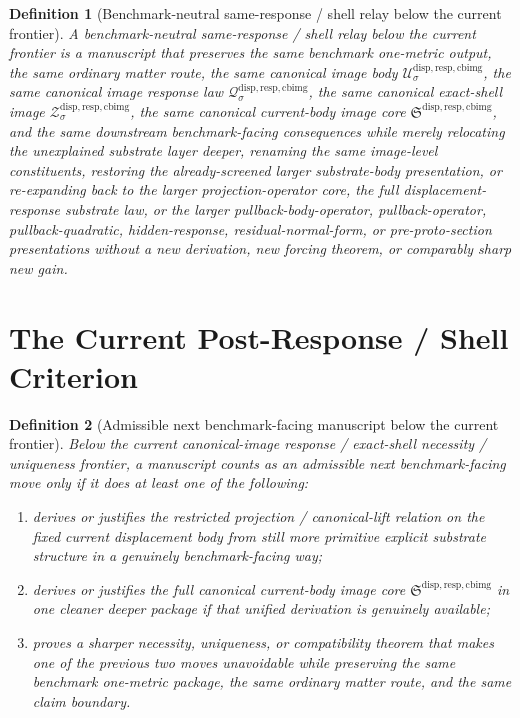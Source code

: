 \documentclass[11pt]{article}
\newcommand{\CurrentBodyImageCore}{\mathfrak S^{\mathrm{disp,resp,cbimg}}}
\newcommand{\CanonicalImageBody}[1]{\mathcal U_{#1}^{\mathrm{disp,resp,cbimg}}}
\newcommand{\CanonicalImageShell}[1]{\mathcal Z_{#1}^{\mathrm{disp,resp,cbimg}}}
\newcommand{\CanonicalImageResponseLaw}[1]{\mathscr Q_{#1}^{\mathrm{disp,resp,cbimg}}}
\newtheorem{definition}{Definition}
\begin{document}
\begin{definition}[Benchmark-neutral same-response / shell relay below the current frontier]
A \emph{benchmark-neutral same-response / shell relay below the current frontier} is a manuscript that preserves the same benchmark one-metric output, the same ordinary matter route, the same canonical image body \(\CanonicalImageBody{\sigma}\), the same canonical image response law \(\CanonicalImageResponseLaw{\sigma}\), the same canonical exact-shell image \(\CanonicalImageShell{\sigma}\), the same canonical current-body image core \(\CurrentBodyImageCore\), and the same downstream benchmark-facing consequences while merely relocating the unexplained substrate layer deeper, renaming the same image-level constituents, restoring the already-screened larger substrate-body presentation, or re-expanding back to the larger projection-operator core, the full displacement-response substrate law, or the larger pullback-body-operator, pullback-operator, pullback-quadratic, hidden-response, residual-normal-form, or pre-proto-section presentations without a new derivation, new forcing theorem, or comparably sharp new gain.
\end{definition}

\section{The Current Post-Response / Shell Criterion}

\begin{definition}[Admissible next benchmark-facing manuscript below the current frontier]
Below the current canonical-image response / exact-shell necessity / uniqueness frontier, a manuscript counts as an admissible next benchmark-facing move only if it does at least one of the following:
\begin{enumerate}
    \item derives or justifies the restricted projection / canonical-lift relation on the fixed current displacement body from still more primitive explicit substrate structure in a genuinely benchmark-facing way;
    \item derives or justifies the full canonical current-body image core \(\CurrentBodyImageCore\) in one cleaner deeper package if that unified derivation is genuinely available;
    \item proves a sharper necessity, uniqueness, or compatibility theorem that makes one of the previous two moves unavoidable while preserving the same benchmark one-metric package, the same ordinary matter route, and the same claim boundary.
\end{enumerate}
\end{definition}
\end{document}
